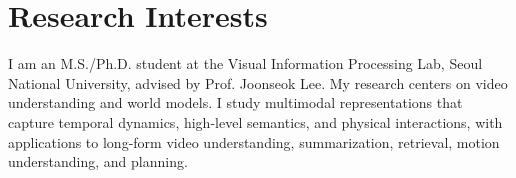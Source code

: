 \section{Research Interests}

\begin{onecolentry}
    I am an M.S./Ph.D. student at the Visual Information Processing Lab, Seoul National University, advised by Prof. Joonseok Lee. My research centers on video understanding and world models. I study multimodal representations that capture temporal dynamics, high-level semantics, and physical interactions, with applications to long-form video understanding, summarization, retrieval, motion understanding, and planning.
\end{onecolentry}
